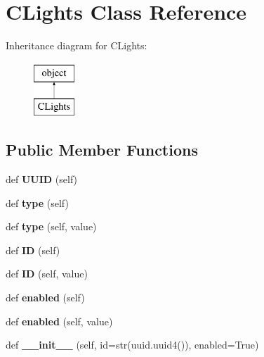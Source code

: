\hypertarget{class_c_lights_1_1_c_lights}{}\section{C\+Lights Class Reference}
\label{class_c_lights_1_1_c_lights}
Inheritance diagram for C\+Lights\+:\begin{figure}[H]
\begin{center}
\leavevmode
\includegraphics[height=2.000000cm]{class_c_lights_1_1_c_lights}
\end{center}
\end{figure}
\subsection*{Public Member Functions}
\begin{DoxyCompactItemize}
\item 
\mbox{\label{class_c_lights_1_1_c_lights_abbcfc1a774079da020e49c42cbadb693}} 
def {\bfseries U\+U\+ID} (self)
\item 
\mbox{\label{class_c_lights_1_1_c_lights_aff464267544e4efc9b770c8320c8f199}} 
def {\bfseries type} (self)
\item 
\mbox{\label{class_c_lights_1_1_c_lights_aca033702f187894894d3102de41d6b99}} 
def {\bfseries type} (self, value)
\item 
\mbox{\label{class_c_lights_1_1_c_lights_adb8818239148d2e5c5833a2b062ee9ad}} 
def {\bfseries ID} (self)
\item 
\mbox{\label{class_c_lights_1_1_c_lights_a0a178fbcae3f6431733dd63ee37ac7bb}} 
def {\bfseries ID} (self, value)
\item 
\mbox{\label{class_c_lights_1_1_c_lights_a05cd4cd28b324f262fefe1a1782bd992}} 
def {\bfseries enabled} (self)
\item 
\mbox{\label{class_c_lights_1_1_c_lights_a18495e0c3f2639c84751c9aa77cd03b3}} 
def {\bfseries enabled} (self, value)
\item 
\mbox{\label{class_c_lights_1_1_c_lights_a71963b9940a29bf3f2c10546c2cb9b50}} 
def {\bfseries \+\_\+\+\_\+init\+\_\+\+\_\+} (self, id=str(uuid.\+uuid4()), enabled=True)
\end{DoxyCompactItemize}



